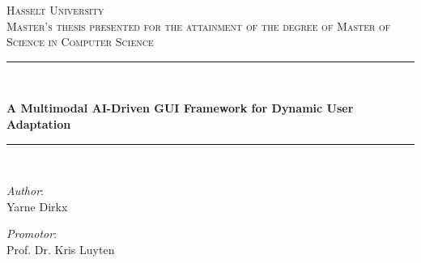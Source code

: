 \documentclass[openany]{book}
\begin{document}
\begin{titlepage}

\newcommand{\HRule}{\rule{\linewidth}{0.5mm}} %

\center
 

\textsc{\LARGE Hasselt University}\\[1.0cm]
\textsc{\Large Master's thesis presented for the attainment of the degree of Master of Science in Computer Science}\\[0.5cm]

\HRule \\[0.2cm]
{ \huge  \bfseries A Multimodal AI-Driven GUI Framework for Dynamic User Adaptation \par} 
\HRule \\[1.5cm]
 

\begin{minipage}[t]{0.5\textwidth}
    \begin{flushleft}
        \large \textit{Author}:\vspace*{0.5cm} \\
        Yarne Dirkx
    \end{flushleft}
\end{minipage}%
%
\begin{minipage}[t]{0.5\textwidth}
    \begin{flushright}
        \large \textit{Promotor}:\vspace*{0.5cm} \\
        Prof. Dr. Kris Luyten\\
        \vspace*{0.5cm}
    \end{flushright}
\end{minipage}


\end{titlepage}
\end{document}
